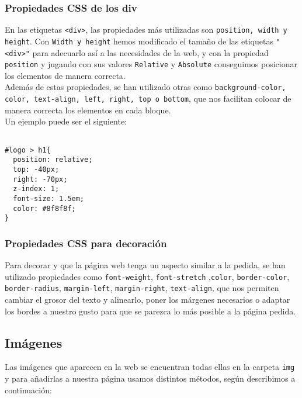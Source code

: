 \documentclass[10pt,a4paper]{article}
\begin{document}
\subsubsection{Propiedades CSS de los div}

En las etiquetas \texttt{<div>}, las propiedades más utilizadas son \texttt{position, width y height}. Con \texttt{Width y height} hemos modificado el tamaño de las etiquetas \texttt{"<div>"} para adecuarlo así a las necesidades de la web, y con la propiedad \texttt{position} y jugando con sus valores \texttt{Relative} y \texttt{Absolute} conseguimos posicionar los elementos de manera correcta.\\

Además de estas propiedades, se han utilizado otras como \texttt{background-color, color, text-align, left, right, top o bottom}, que nos facilitan colocar de manera correcta los elementos en cada bloque.\\

Un ejemplo puede ser el siguiente:

\begin{verbatim}

#logo > h1{
  position: relative;
  top: -40px;
  right: -70px;
  z-index: 1;
  font-size: 1.5em;
  color: #8f8f8f;
}

\end{verbatim}

\subsubsection{Propiedades CSS para decoración}

Para decorar y que la página web tenga un aspecto similar a la pedida, se han utilizado propiedades como \texttt{font-weight}, \texttt{font-stretch} ,\texttt{color}, \texttt{border-color}, \texttt{border-radius}, \texttt{margin-left}, \texttt{margin-right}, \texttt{text-align},
que nos permiten cambiar el grosor del texto y alinearlo, poner los márgenes necesarios o adaptar los bordes a nuestro gusto para que se parezca lo más posible a la página pedida.


\subsection{Imágenes}

Las imágenes que aparecen en la web se encuentran todas ellas en la carpeta \texttt{img} y para añadirlas a nuestra página usamos distintos métodos, según describimos a continuación:\\
\end{document}
